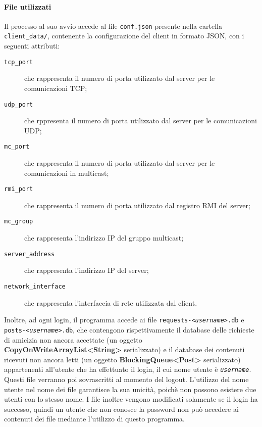 \documentclass[11pt]{article}
\begin{document}
\paragraph{File utilizzati} Il processo al suo avvio accede al file
{\tt conf.json} presente nella cartella {\tt client\_data/}, contenente la
configurazione del client in formato JSON, con i seguenti attributi:

\begin{description}
	\item[{\tt tcp\_port}] che rappresenta il numero di porta utilizzato dal
	server per le comunicazioni TCP;
	\item[{\tt udp\_port}] che rppresenta il numero di porta utilizzato dal
	server per le comunicazioni UDP;
	\item[{\tt mc\_port}] che rappresenta il numero di porta utilizzato dal
	server per le comunicazioni in multicast;
	\item[{\tt rmi\_port}] che rappresenta il numero di porta utilizzato dal
	registro RMI del server;
	\item[{\tt mc\_group}] che rappresenta l'indirizzo IP del gruppo multicast;
	\item[{\tt server\_address}] che rappresenta l'indirizzo IP del server;
	\item[{\tt network\_interface}] che rappresenta l'interfaccia di rete
	utilizzata dal client.
\end{description}

Inoltre, ad ogni login, il programma accede ai file
{\tt requests-<\emph{username}>.db} e {\tt posts-<\emph{username}>.db}, che
contengono rispettivamente il database delle richieste di amicizia non ancora
accettate (un oggetto {\bf CopyOnWriteArrayList<String>} serializzato) e il
database dei contenuti ricevuti non ancora letti (un oggetto
{\bf BlockingQueue<Post>} serializzato) appartenenti all'utente che ha
effettuato il login, il cui nome utente è {\tt \emph{username}}. Questi file
verranno poi sovrascritti al momento del logout. L'utilizzo del nome utente nel
nome dei file garantisce la sua unicità, poichè non possono esistere due utenti
con lo stesso nome. I file inoltre vengono modificati solamente se il login ha
successo, quindi un utente che non conosce la password non può accedere ai
contenuti dei file mediante l'utilizzo di questo programma.
\end{document}
